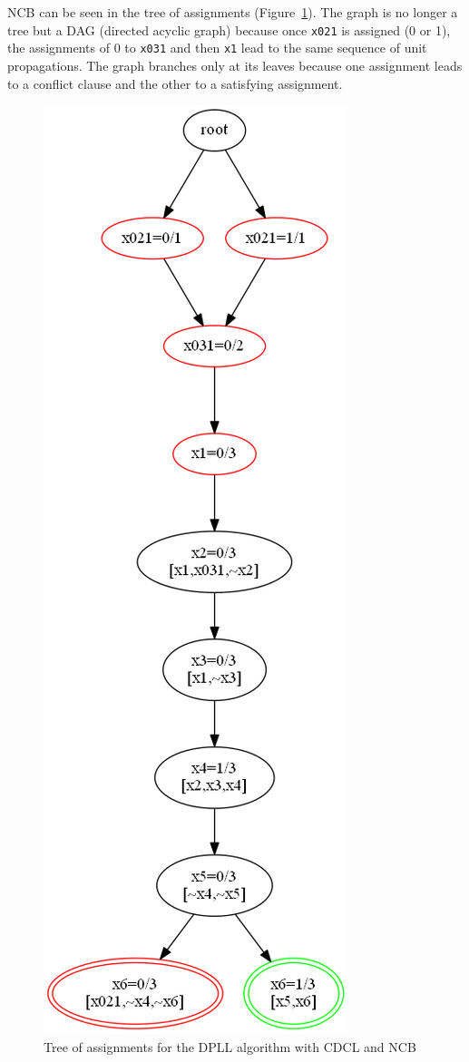 \documentclass[11pt]{article}
\newcommand*{\p}[1]{\textup{\texttt{#1}}}
\begin{document}
NCB can be seen in the tree of assignments (Figure~\ref{tree3}). The
graph is no longer a tree but a DAG (directed acyclic graph) because
once \p{x021} is assigned (0 or 1), the assignments of 0 to \p{x031} and
then \p{x1} lead to the same sequence of unit propagations. The graph
branches only at its leaves because one assignment leads to a conflict
clause and the other to a satisfying assignment.

\begin{figure}
\begin{center}
\includegraphics[keepaspectratio=true,height=.9\textheight]{tree3}
\end{center}
\caption{Tree of assignments for the DPLL algorithm with CDCL and NCB}\label{tree3}
\end{figure}


\newpage



\end{document}
